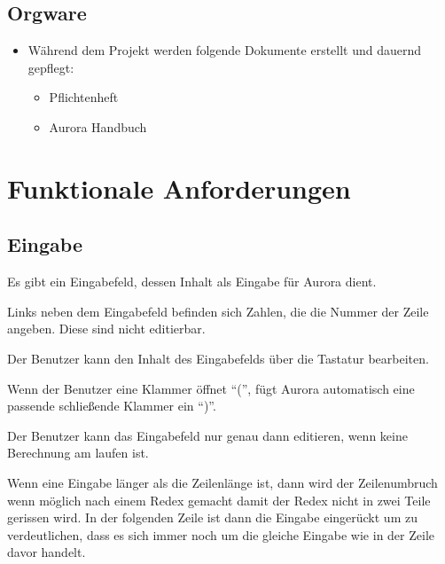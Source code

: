 \documentclass[parskip=full,11pt,twoside]{scrartcl}
\begin{document}
\subsection{Orgware}
	\begin{itemize}
		\item Während dem Projekt werden folgende Dokumente erstellt und dauernd gepflegt:
			\begin{itemize}
				\item Pflichtenheft
				\item Aurora Handbuch
			\end{itemize}
	\end{itemize}
\newpage


\section{Funktionale Anforderungen}

\subsection{Eingabe}

Es gibt ein Eingabefeld, dessen Inhalt als Eingabe für Aurora dient.

Links neben dem Eingabefeld befinden sich Zahlen, die die Nummer der Zeile angeben. Diese sind nicht editierbar.

Der Benutzer kann den Inhalt des Eingabefelds über die Tastatur bearbeiten.

Wenn der Benutzer eine Klammer öffnet \enquote{(}, fügt Aurora automatisch eine passende schließende Klammer ein \enquote{)}.

Der Benutzer kann das Eingabefeld nur genau dann editieren, wenn keine Berechnung am laufen ist.

Wenn eine Eingabe länger als die Zeilenlänge ist, dann wird der Zeilenumbruch wenn möglich nach einem Redex gemacht damit der Redex nicht in zwei Teile gerissen wird. In der folgenden Zeile ist dann
die Eingabe eingerückt um zu verdeutlichen, dass es sich immer noch um die gleiche Eingabe wie in der Zeile davor handelt.
\end{document}
